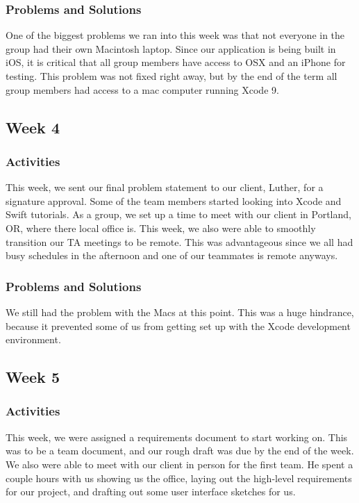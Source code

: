 \documentclass[onecolumn, draftclsnofoot,10pt, compsoc]{IEEEtran}
\begin{document}
\subsubsection{Problems and Solutions}
One of the biggest problems we ran into this week was that not everyone in the group had their own Macintosh laptop. Since our application is being built in iOS, it is critical that all group members have access to OSX and an iPhone for testing. This problem was not fixed right away, but by the end of the term all group members had access to a mac computer running Xcode 9. 

\subsection{Week 4}
\subsubsection{Activities}
This week, we sent our final problem statement to our client, Luther, for a signature approval. Some of the team members started looking into Xcode and Swift tutorials. As a group, we set up a time to meet with our client in Portland, OR, where there local office is. This week, we also were able to smoothly transition our TA meetings to be remote. This was advantageous since we all had busy schedules in the afternoon and one of our teammates is remote anyways.
\subsubsection{Problems and Solutions}
We still had the problem with the Macs at this point. This was a huge hindrance, because it prevented some of us from getting set up with the Xcode development environment. 

\subsection{Week 5}
\subsubsection{Activities}
This week, we were assigned a requirements document to start working on. This was to be a team document, and our rough draft was due by the end of the week. We also were able to meet with our client in person for the first team. He spent a couple hours with us showing us the office, laying out the high-level requirements for our project, and drafting out some user interface sketches for us.
\end{document}
